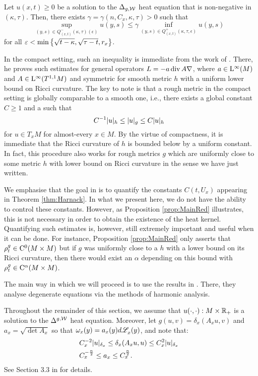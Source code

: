 \documentclass[a4paper, 12pt]{amsart}
\begin{document}
\begin{thm}
\label{thm:Harnack}
Let $u(x,t) \geq 0$ be a 
solution to the $\Delta_{g,\mathcal{W}}$ heat equation 
that is non-negative in $(\kappa, \tau)$. 
Then, there exists $\gamma = \gamma(n, C_x, \kappa, \tau) > 0$ such that 
$$ \sup_{(y,s) \in Q^-_{(x,t)}(\kappa, \tau)(\epsilon)} u(y, s) 
	\leq \gamma \inf_{(y,s) \in Q^+_{(x,t)}(\kappa,\tau,\epsilon)} u(y,s)$$
for all $\varepsilon < \min\left\{ \sqrt{t - \kappa}, \sqrt{\tau - t}, r_x\right\}$.
\end{thm} 

In the compact setting, such an inequality 
is immediate from the work of \cite{SC}. There, 
he proves such estimates for general operators
$L = -a \operatorname{div} A \nabla$, where $a \in {\rm L}^{\infty}_{\rm {}}(M)$
and $A \in {\rm L}^{\infty}_{\rm {}}(T^{1,1}M)$ and symmetric
for smooth metric $h$ with a uniform lower bound
on Ricci curvature.
The key to note is that a rough metric in the 
compact setting is globally comparable to a smooth one, 
i.e., there exists a global constant $C \geq 1$ 
and a 
such that
$$ C^{-1} |u|_{h} \leq |u|_g \leq C |u|_{h}$$
for $u \in T_x M$ for almost-every $x \in M$.
By the virtue of compactness, it is immediate
that the Ricci curvature of $h$ is bounded below
by a uniform constant. 
In fact, this procedure also works 
for rough metrics $g$ which 
are uniformly close to some metric $h$ with 
lower bound on Ricci curvature in the sense
we have just written.

We emphasise that the goal in \cite{SC}
is to quantify the constants $C(t,U_x)$
appearing in Theorem \ref{thm:Harnack}. In what we present here, we do not have
the ability to control these constants. However, as
Proposition \ref{prop:MainRed} illustrates, this is not necessary 
in order to obtain the existence of the heat kernel.
Quantifying such estimates is, however, still 
extremely important and useful when it can be done.
For instance, Proposition \ref{prop:MainRed} 
only asserts that $\rho^{g}_t \in {\rm C}^{0}_{\rm {}}(M \times M)$
but if $g$ was uniformly close to a $h$
with a lower bound on its Ricci curvature, then
there would exist an $\alpha$ depending on this bound
with $\rho^{g}_t \in {\rm C}^{\alpha}_{\rm {}}(M \times M)$.

The main way in which we will proceed is to use the
results in \cite{CS}. There, they analyse
degenerate equations via the methods of harmonic analysis.

Throughout the remainder of this section,
we assume that $u(\cdot, \cdot): M \times \mathbb{R}_+$ 
is a solution to the $\Delta^{g,\mathcal{W}}$ heat equation.
Moreover, let $g(u,v) = \delta_x(A_x u,v)$
and $a_x = \sqrt{\det A_x}$ so that
$\omega_x(y) = a_x(y)d\mathscr{L}^{{}}_x(y)$, and note
that:
\begin{equation}
\label{eq:constbd}
\begin{split}
&C_x^{-2} |u|_{\delta_x} \leq \delta_x(A_x u, u) \leq C_x^2 |u|_{\delta_x} \\
&C_x^{-\frac{n}{2}} \leq a_x \leq C_x^{\frac{n}{2}}.
\end{split}
\end{equation}
See Section 3.3 in \cite{BRough} for details. 
\end{document}
